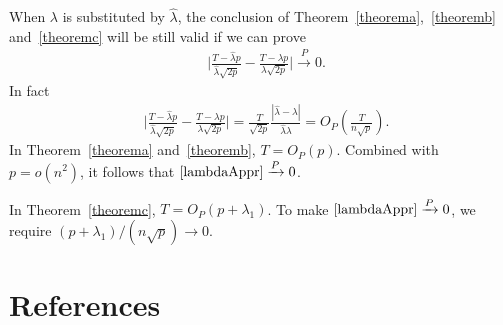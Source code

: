 \documentclass[review]{elsarticle}
\theoremstyle{plain}
\theoremstyle{definition}
\theoremstyle{remark}
\begin{document}
 When $\lambda$ is substituted by $\hat{\lambda}$,
 the conclusion of Theorem~\ref{theorema},~\ref{theoremb} and~\ref{theoremc} will be still valid if we can prove
\begin{equation*}
    \begin{aligned}
        &\Big|\frac{T-{\hat{\lambda} p}}{\hat{\lambda}\sqrt{2p}}-
        \frac{T-{\lambda p}}{\lambda\sqrt{2p}}\Big|\xrightarrow{P} 0.
    \end{aligned}
\end{equation*}
In fact
\begin{equation}\label{lambdaAppr}
    \begin{aligned}
        &\Big|\frac{T-{\hat{\lambda} p}}{\hat{\lambda}\sqrt{2p}}-
        \frac{T-{\lambda p}}{\lambda\sqrt{2p}}\Big|
        =\frac{T}{\sqrt{2p}}\frac{|\hat{\lambda}-\lambda|}{\hat{\lambda}\lambda}
        =O_P(\frac{T}{n\sqrt{p}}).
    \end{aligned}
\end{equation}
In Theorem~\ref{theorema} and~\ref{theoremb}, $T=O_P(p)$. Combined with $p=o(n^2)$, it follows that $\eqref{lambdaAppr}\xrightarrow{P} 0$.

In Theorem~\ref{theoremc}, $T=O_P(p+\lambda_1)$. To make $\eqref{lambdaAppr}\xrightarrow{P} 0$, we require ${(p+\lambda_1)}/{(n\sqrt{p})}\to 0$.





\section*{References}

\end{document}
